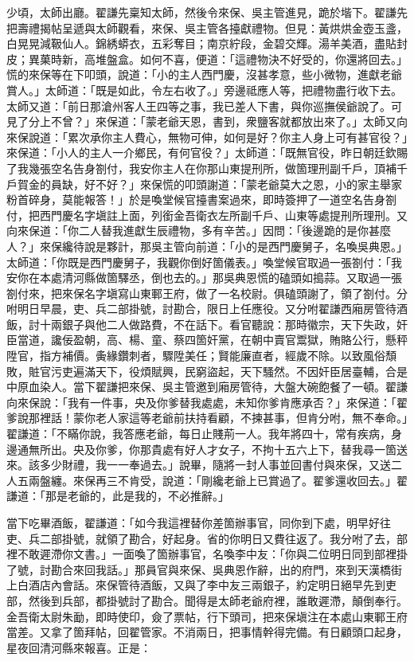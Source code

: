 少頃，太師出廳。翟謙先稟知太師，然後令來保、吳主管進見，跪於堦下。翟謙先把壽禮揭帖呈遞與太師觀看，來保、吳主管各擡獻禮物。但見：黃烘烘金壺玉盞，白晃晃減靸仙人。錦綉蟒衣，五彩奪目；南京紵段，金碧交輝。湯羊美酒，盡貼封皮；異菓時新，高堆盤盒。{}如何不喜，便道：「這禮物決不好受的，你還將回去。」慌的來保等在下叩頭，說道：「小的主人西門慶，沒甚孝意，些小微物，進獻老爺賞人。」太師道：「既是如此，令左右收了。」旁邊祗應人等，把禮物盡行收下去。太師又道：「前日那滄州客人王四等之事，我已差人下書，與你巡撫侯爺說了。可見了分上不曾？」{}來保道：「蒙老爺天恩，書到，衆鹽客就都放出來了。」太師又向來保說道：「累次承你主人費心，無物可伸，如何是好？你主人身上可有甚官役？」來保道：「小人的主人一介鄉民，有何官役？」太師道：「既無官役，昨日朝廷欽賜了我幾張空名告身劄付，我安你主人在你那山東提刑所，做箇理刑副千戶，頂補千戶賀金的員缺，好不好？」來保慌的叩頭謝道：「蒙老爺莫大之恩，小的家主舉家粉首碎身，莫能報答！」於是喚堂候官擡書案過來，即時簽押了一道空名告身劄付，把西門慶名字塡註上面，列銜金吾衛衣左所副千戶、山東等處提刑所理刑。又向來保道：「你二人替我進獻生辰禮物，多有辛苦。」因問：「後邊跪的是你甚麼人？」來保纔待說是夥計，那吳主管向前道：「小的是西門慶舅子，名喚吳典恩。」{}太師道：「你既是西門慶舅子，我觀你倒好箇儀表。」喚堂候官取過一張劄付：「我安你在本處清河縣做箇驛丞，倒也去的。」那吳典恩慌的磕頭如搗蒜。又取過一張劄付來，把來保名字塡寫山東鄆王府，做了一名校尉。俱磕頭謝了，領了劄付。分咐明日早晨，吏、兵二部掛號，討勘合，限日上任應役。又分咐翟謙西廂房管待酒飯，討十兩銀子與他二人做路費，不在話下。看官聽說：那時徽宗，天下失政，奸臣當道，讒佞盈朝，高、楊、童、蔡四箇奸黨，在朝中賣官鬻獄，賄賂公行，懸秤陞官，指方補價。夤緣鑽刺者，驟陞美任；賢能廉直者，經歲不除。以致風俗頹敗，賍官污吏遍滿天下，役煩賦興，民窮盜起，天下騷然。不因奸臣居臺輔，合是中原血染人。當下翟謙把來保、吳主管邀到廂房管待，大盤大碗飽餐了一頓。翟謙向來保說：「我有一件事，央及你爹替我處處，未知你爹肯應承否？」來保道：「翟爹說那裡話！蒙你老人家這等老爺前扶持看顧，不揀甚事，但肯分咐，無不奉命。」翟謙道：「不瞞你說，我答應老爺，每日止賤荊一人。我年將四十，常有疾病，身邊通無所出。央及你爹，你那貴處有好人才女子，不拘十五六上下，替我尋一箇送來。該多少財禮，我一一奉過去。」{}說畢，隨將一封人事並回書付與來保，又送二人五兩盤纏。來保再三不肯受，說道：「剛纔老爺上已賞過了。翟爹還收回去。」翟謙道：「那是老爺的，此是我的，不必推辭。」

當下吃畢酒飯，翟謙道：「如今我這裡替你差箇辦事官，同你到下處，明早好往吏、兵二部掛號，就領了勘合，好起身。省的你明日又費往返了。我分咐了去，部裡不敢遲滯你文書。」一面喚了箇辦事官，名喚李中友：「你與二位明日同到部裡掛了號，討勘合來回我話。」那員官與來保、吳典恩作辭，出的府門，來到天漢橋街上白酒店內會話。來保管待酒飯，又與了李中友三兩銀子，約定明日絕早先到吏部，然後到兵部，都掛號討了勘合。聞得是太師老爺府裡，誰敢遲滯，顛倒奉行。金吾衛太尉朱勔，即時使印，僉了票帖，行下頭司，把來保塡注在本處山東鄆王府當差。又拿了箇拜帖，回翟管家。{}不消兩日，把事情幹得完備。有日顧頭口起身，星夜回清河縣來報喜。正是：

